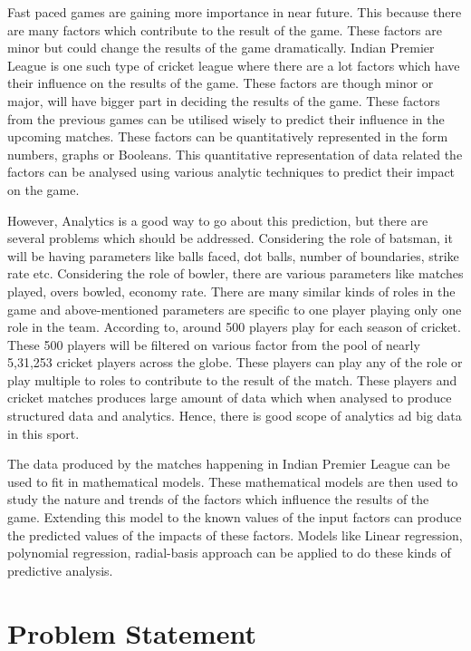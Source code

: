\documentclass[sigconf]{acmart}
\begin{document}
Fast paced games are gaining more importance in near future. This because there are many factors which contribute to the result of the game. These factors are minor but could change the results of the game dramatically. Indian Premier League is one such type of cricket league where there are a lot factors which have their influence on the results of the game. These factors are though minor or major, will have bigger part in deciding the results of the game. These factors from the previous games can be utilised wisely to predict their influence in the upcoming matches.  These factors can be quantitatively represented in the form numbers, graphs or Booleans. This quantitative representation of data related the factors can be analysed using various analytic techniques to predict their impact on the game.


	However, Analytics is a good way to go about this prediction, but there are several problems which should be addressed. Considering the role of batsman, it will be having parameters like balls faced, dot balls, number of boundaries, strike rate etc. Considering the role of bowler, there are various parameters like matches played, overs bowled, economy rate. There are many similar kinds of roles in the game and above-mentioned parameters are specific to one player playing only one role in the team. According to, around 500 players play for each season of cricket. These 500 players will be filtered on various factor from the pool of nearly 5,31,253 cricket players across the globe. These players can play any of the role or play multiple to roles to contribute to the result of the match. These players and cricket matches produces large amount of data which when analysed to produce structured data and analytics. Hence, there is good scope of analytics ad big data in this sport.
	
	
	The data produced by the matches happening in Indian Premier League can be used to fit in mathematical models. These mathematical models are then used to study the nature and trends of the factors which influence the results of the game. Extending this model to the known values of the input factors can produce the predicted values of the impacts of these factors. Models like Linear regression, polynomial regression, radial-basis approach can be applied to do these kinds of predictive analysis. 



\section{Problem Statement}
\end{document}
